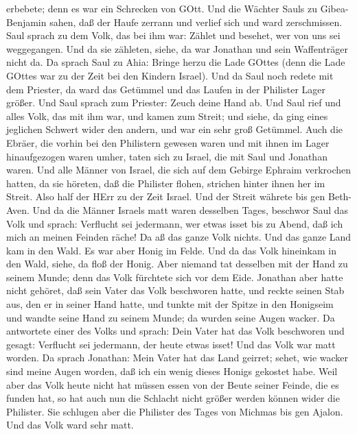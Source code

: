 erbebete; denn es war ein Schrecken von GOtt.  Und die
Wächter Sauls zu Gibea-Benjamin sahen, daß der Haufe zerrann und verlief
sich und ward zerschmissen.  Saul sprach zu dem Volk, das
bei ihm war: Zählet und besehet, wer von uns sei weggegangen. Und da sie
zähleten, siehe, da war Jonathan und sein Waffenträger nicht da.
 Da sprach Saul zu Ahia: Bringe herzu die Lade GOttes (denn
die Lade GOttes war zu der Zeit bei den Kindern Israel). 
Und da Saul noch redete mit dem Priester, da ward das Getümmel und das
Laufen in der Philister Lager größer. Und Saul sprach zum Priester:
Zeuch deine Hand ab.  Und Saul rief und alles Volk, das mit
ihm war, und kamen zum Streit; und siehe, da ging eines jeglichen
Schwert wider den andern, und war ein sehr groß Getümmel. 
Auch die Ebräer, die vorhin bei den Philistern gewesen waren und mit
ihnen im Lager hinaufgezogen waren umher, taten sich zu Israel, die mit
Saul und Jonathan waren.  Und alle Männer von Israel, die
sich auf dem Gebirge Ephraim verkrochen hatten, da sie höreten, daß die
Philister flohen, strichen hinter ihnen her im Streit. 
Also half der HErr zu der Zeit Israel. Und der Streit währete bis gen
Beth-Aven.  Und da die Männer Israels matt waren desselben
Tages, beschwor Saul das Volk und sprach: Verflucht sei jedermann, wer
etwas isset bis zu Abend, daß ich mich an meinen Feinden räche! Da aß
das ganze Volk nichts.  Und das ganze Land kam in den Wald.
Es war aber Honig im Felde.  Und da das Volk hineinkam in
den Wald, siehe, da floß der Honig. Aber niemand tat desselben mit der
Hand zu seinem Munde; denn das Volk fürchtete sich vor dem Eide.
 Jonathan aber hatte nicht gehöret, daß sein Vater das Volk
beschworen hatte, und reckte seinen Stab aus, den er in seiner Hand
hatte, und tunkte mit der Spitze in den Honigseim und wandte seine Hand
zu seinem Munde; da wurden seine Augen wacker.  Da
antwortete einer des Volks und sprach: Dein Vater hat das Volk
beschworen und gesagt: Verflucht sei jedermann, der heute etwas isset!
Und das Volk war matt worden.  Da sprach Jonathan: Mein
Vater hat das Land geirret; sehet, wie wacker sind meine Augen worden,
daß ich ein wenig dieses Honigs gekostet habe.  Weil aber
das Volk heute nicht hat müssen essen von der Beute seiner Feinde, die
es funden hat, so hat auch nun die Schlacht nicht größer werden können
wider die Philister.  Sie schlugen aber die Philister des
Tages von Michmas bis gen Ajalon. Und das Volk ward sehr matt.
